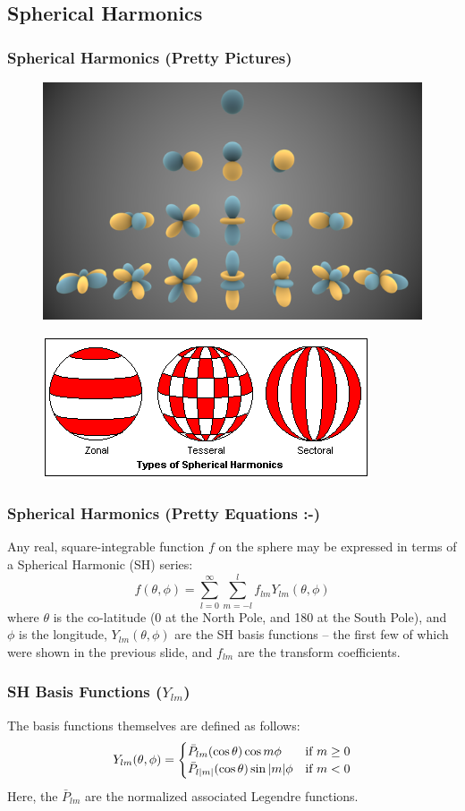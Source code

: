 \documentclass[aspectratio=43,mathserif]{beamer}
\begin{document}
\subsection{Spherical Harmonics} %

\begin{frame}
\frametitle{Spherical Harmonics (Pretty Pictures)}
\begin{figure}

\includegraphics[width=0.4\linewidth]{Spherical_Harmonics.png}
\end{figure}

\begin{figure}
\includegraphics[width=0.4\linewidth]{harmosZonalSectoral.png}
\end{figure}
\end{frame}

\begin{frame}
\frametitle{Spherical Harmonics (Pretty Equations :-)}
Any real, square-integrable function $f$ on the sphere  may be expressed in terms of a Spherical Harmonic (SH) series:
$$ f(\theta,\phi) = \sum_{l=0}^\infty \sum_{m=-l}^{l} f_{l m} Y_{l m}(\theta,\phi)$$
where $\theta$ is the co-latitude (0\degree\/ at the North Pole, and 180\degree\/ at the South Pole), and $\phi$ is the longitude, $Y_{l m}(\theta,\phi)$ are the SH basis functions -- the first few of which were shown in the previous slide, and $f_{l m}$ are the transform coefficients.

\end{frame}

\begin{frame}
\frametitle{SH Basis Functions ($Y_{l m}$)}

The basis functions themselves are defined as follows:
$$ Y_{l m}(\theta,\phi) = \begin{cases} 
\bar{P}_{lm}(\cos \theta) \cos m \phi & \mbox{if } m \ge 0 \\
\bar{P}_{l \/|m|}(\cos \theta) \sin |m| \phi & \mbox{if } m < 0
\end{cases}$$
Here, the $\bar{P}_{lm}$ are the normalized associated Legendre functions.
\end{frame}
\end{document}

